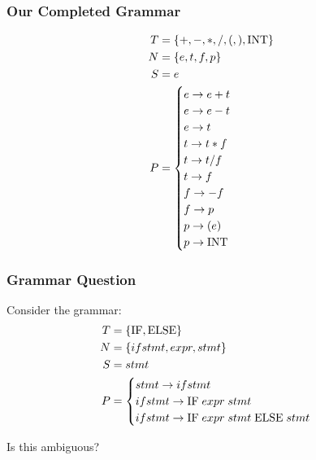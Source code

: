 \documentclass[aspectratio=169]{beamer}
\begin{document}
\begin{frame}
\frametitle{Our Completed Grammar}

\begin{align*}
T &= \{ +, -, *, /, (, ), \text{\lstinline{INT}} \}\\
N &= \{ e, t, f, p \}\\
S &= e\\
P &= \begin{cases}e \rightarrow e + t\\
     e \rightarrow e - t\\
     e \rightarrow t\\
     t \rightarrow t * f\\
     t \rightarrow t / f\\
     t \rightarrow f\\
     f \rightarrow - f\\
     f \rightarrow p\\
     p \rightarrow ( e )\\
     p \rightarrow \text{\lstinline{INT}}\end{cases}
\end{align*}
\end{frame}

\begin{frame}
\frametitle{Grammar Question}

Consider the grammar:
\begin{align*}
T &= \{ \text{\lstinline{IF}}, \text{\lstinline{ELSE}} \}\\
N &= \{ ifstmt, expr, stmt \}\\
S &= stmt\\
P &= \begin{cases}stmt \rightarrow ifstmt\\
     ifstmt \rightarrow \text{\lstinline{IF}} \; expr \; stmt\\
     ifstmt \rightarrow \text{\lstinline{IF}} \; expr \; stmt \;
                        \text{\lstinline{ELSE}} \; stmt\end{cases}
\end{align*}

Is this ambiguous?
\end{frame}
\end{document}
